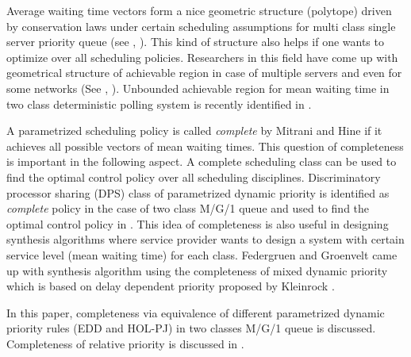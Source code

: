 \documentclass[letterpaper, 10 pt, conference]{ieeeconf}  %
\begin{document}
Average waiting time vectors form a nice geometric structure (polytope) driven by conservation laws under certain scheduling assumptions for multi class single server priority queue (see \cite{coffman1980characterization}, \cite{shanthikumar1992multiclass}). This kind of structure also helps if one wants to optimize over all scheduling policies. Researchers in this field have come up with geometrical structure of achievable region in case of multiple servers and even for some networks (See \cite{federgruen}, \cite{bertsimas}). Unbounded achievable region for mean waiting time in two class deterministic polling system is recently identified in \cite{2classpolling}. 


A parametrized scheduling policy is called \textit{complete} by Mitrani and Hine \cite{complete} if it achieves all possible vectors of mean waiting times. This question of completeness is important in the following aspect. A complete scheduling class can be used to find the optimal control policy over all scheduling disciplines. Discriminatory processor sharing (DPS) class of parametrized dynamic priority is identified as \textit{complete} policy in the case of two class M/G/1 queue and used to find the optimal control policy in \cite{hassin2009use}. This idea of completeness is also useful in designing synthesis algorithms where service provider wants to design a system with certain service level (mean waiting time) for each class. Federgruen and Groenvelt \cite{federgruen} came up with synthesis algorithm using the completeness of mixed dynamic priority which is based on delay dependent priority proposed by Kleinrock \cite{Kleinrock1964}. 

In this paper, completeness via equivalence of different parametrized dynamic priority rules (EDD and HOL-PJ) in two classes M/G/1 queue is discussed. Completeness of relative priority is discussed in \cite{complete_TR}.
\end{document}
